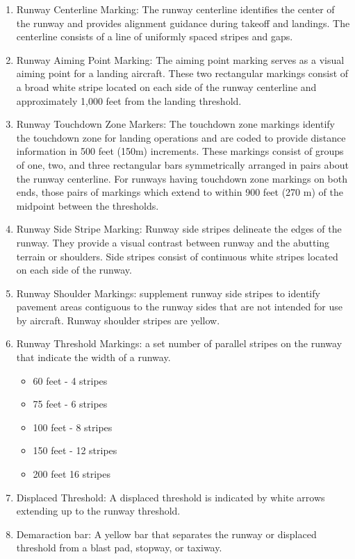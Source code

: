 \documentclass[12pt]{article}
\begin{document}
\begin{itemize}
\begin{enumerate}
					\item Runway Centerline Marking: The runway centerline identifies the center of the runway and provides alignment guidance during takeoff and landings. The centerline consists of a line of uniformly spaced stripes and gaps. 
					\item Runway Aiming Point Marking: The aiming point marking serves as a visual aiming point for a landing aircraft. These two rectangular markings consist of a broad white stripe located on each side of the runway centerline and approximately 1,000 feet from the landing threshold.
					\item Runway Touchdown Zone Markers: The touchdown zone markings identify the touchdown zone for landing operations and are coded to provide distance information in 500 feet (150m) increments. These markings consist of groups of one, two, and three rectangular bars symmetrically arranged in pairs about the runway centerline. For runways having touchdown zone markings on both ends, those pairs of markings which extend to within 900 feet (270 m) of the midpoint between the thresholds.
					\item Runway Side Stripe Marking: Runway side stripes delineate the edges of the runway. They provide a visual contrast between runway and the abutting terrain or shoulders. Side stripes consist of continuous white stripes located on each side of the runway.
					\item Runway Shoulder Markings: supplement runway side stripes to identify pavement areas contiguous to the runway sides that are not intended for use by aircraft. Runway shoulder stripes are yellow.
					\item Runway Threshold Markings: a set number of parallel stripes on the runway that indicate the width of a runway.
						\begin{itemize}
							\item 60 feet - 4 stripes
							\item 75 feet - 6 stripes
							\item 100 feet - 8 stripes
							\item 150 feet - 12 stripes
							\item 200 feet 16 stripes
						\end{itemize}
					\item Displaced Threshold: A displaced threshold is indicated by white arrows extending up to the runway threshold.
					\item Demaraction bar: A yellow bar that separates the runway or displaced threshold from a blast pad, stopway, or taxiway.

\end{enumerate}
\end{itemize}
\end{document}
